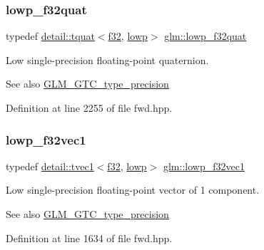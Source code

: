 \subsubsection{\texorpdfstring{lowp\+\_\+f32quat}{lowp\_f32quat}}
{\footnotesize\ttfamily typedef \hyperlink{structglm_1_1detail_1_1tquat}{detail\+::tquat}$<$\hyperlink{group__gtc__type__precision_ga0ec999b57f5330d9021256e96038df04}{f32}, \hyperlink{namespaceglm_a0f04f086094c747d227af4425893f545ae161af3fc695e696ce3bf69f7332bc2d}{lowp}$>$ \hyperlink{group__gtc__type__precision_ga83edc5f21bfa41f72f881b29aabbd919}{glm\+::lowp\+\_\+f32quat}}

Low single-\/precision floating-\/point quaternion. \begin{DoxySeeAlso}{See also}
\hyperlink{group__gtc__type__precision}{G\+L\+M\+\_\+\+G\+T\+C\+\_\+type\+\_\+precision} 
\end{DoxySeeAlso}


Definition at line 2255 of file fwd.\+hpp.

\mbox{\label{group__gtc__type__precision_gae802918ade0497b72c606430830f5ebb}} 
\subsubsection{\texorpdfstring{lowp\+\_\+f32vec1}{lowp\_f32vec1}}
{\footnotesize\ttfamily typedef \hyperlink{structglm_1_1detail_1_1tvec1}{detail\+::tvec1}$<$\hyperlink{group__gtc__type__precision_ga0ec999b57f5330d9021256e96038df04}{f32}, \hyperlink{namespaceglm_a0f04f086094c747d227af4425893f545ae161af3fc695e696ce3bf69f7332bc2d}{lowp}$>$ \hyperlink{group__gtc__type__precision_gae802918ade0497b72c606430830f5ebb}{glm\+::lowp\+\_\+f32vec1}}

Low single-\/precision floating-\/point vector of 1 component. \begin{DoxySeeAlso}{See also}
\hyperlink{group__gtc__type__precision}{G\+L\+M\+\_\+\+G\+T\+C\+\_\+type\+\_\+precision} 
\end{DoxySeeAlso}


Definition at line 1634 of file fwd.\+hpp.

\mbox{\label{group__gtc__type__precision_ga7faa2c9884c87b1e6512a966adad69e4}} 
